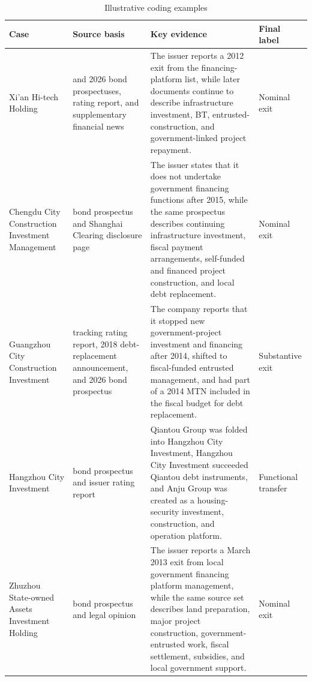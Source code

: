 \begin{table}[htbp]
\centering
\footnotesize
\setlength{\tabcolsep}{4pt}
\begin{tabular}{@{}>{\raggedright\arraybackslash}p{}>{\raggedright\arraybackslash}p{}>{\raggedright\arraybackslash}p{}>{\raggedright\arraybackslash}p{}@{}}
\toprule
Case & Source basis & Key evidence & Final label \\
\midrule
Xi'an Hi-tech Holding & 2020 and 2026 bond prospectuses, rating report, and
supplementary financial news & The issuer reports a 2012 exit from the
financing-platform list, while later documents continue to describe
infrastructure investment, BT, entrusted-construction, and government-linked
project repayment. & Nominal exit \\
Chengdu City Construction Investment Management & 2023 bond prospectus and
Shanghai Clearing disclosure page & The issuer states that it does not
undertake government financing functions after 2015, while the same prospectus
describes continuing infrastructure investment, fiscal payment arrangements,
self-funded and financed project construction, and local debt replacement. &
Nominal exit \\
Guangzhou City Construction Investment & 2018 tracking rating report, 2018
debt-replacement announcement, and 2026 bond prospectus & The company reports
that it stopped new government-project investment and financing after 2014,
shifted to fiscal-funded entrusted management, and had part of a 2014 MTN
included in the fiscal budget for debt replacement. & Substantive exit \\
Hangzhou City Investment & 2024 bond prospectus and issuer rating report &
Qiantou Group was folded into Hangzhou City Investment, Hangzhou City
Investment succeeded Qiantou debt instruments, and Anju Group was created as a
housing-security investment, construction, and operation platform. &
Functional transfer \\
Zhuzhou State-owned Assets Investment Holding & 2026 bond prospectus and legal
opinion & The issuer reports a March 2013 exit from local government financing
platform management, while the same source set describes land preparation,
major project construction, government-entrusted work, fiscal settlement,
subsidies, and local government support. & Nominal exit \\
\bottomrule
\end{tabular}
\caption{Illustrative coding examples}
\label{tab:pilot_cases}
\end{table}

